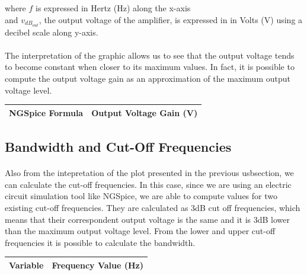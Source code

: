 where $f$ is expressed in Hertz (Hz) along the x-axis\\
and $v_{dB_{out}}$, the output voltage of the amplifier, is expressed in  in Volts (V) using a decibel scale along y-axis.

\paragraph{}
The interpretation of the graphic allows us to see that the output voltage tends to become constant when closer to its maximum values. In fact, it is possible to compute the output voltage gain as an approximation of the maximum output voltage level.


\begin{table}[H] \centering
  \begin{tabular}{|l|r|}
    \hline    
    {\bf NGSpice Formula} & {\bf Output Voltage Gain (V)} \\ \hline
    
  \end{tabular}
 \label{tab:outvoltagegain}
\end{table}


\subsection{Bandwidth and Cut-Off Frequencies}

\paragraph{}
Also from the intepretation of the plot presented in the previous usbsection, we can calculate the cut-off frequencies. In this case, since we are using an electric circuit simulation tool like NGSpice, we are able to compute values for two existing cut-off frequencies. They are calculated as 3dB cut off frequencies, which means that their correspondent output voltage is the same and it is 3dB lower than the maximum output voltage level. From the lower and upper cut-off frequencies it is possible to calculate the bandwidth. 

\begin{table}[H] \centering
  \begin{tabular}{|l|r|}
    \hline    
    {\bf Variable} & {\bf Frequency Value (Hz)} \\ \hline
    
  \end{tabular}
 \label{tab:cutofffreq}
\end{table}

